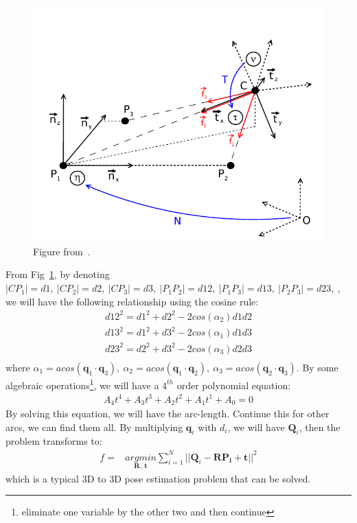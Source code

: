 \documentclass[a4paper]{report}
\begin{document}
\begin{figure}
\centering
\includegraphics[scale=0.5]{hand_eye_files/vision/figures/p3p_kneip.png}
\caption{Figure from~\cite{kneip2011novel}.}
\label{fig:p3p}
\end{figure}
From Fig~\ref{fig:p3p}, by denoting $|CP_1|=d1,\ |CP_2|=d2,\ |CP_3|=d3,\ |P_1P_2|=d12,\ |P_1P_3|=d13,\ |P_2P_3|=d23,\ $, we will have the following relationship using the cosine rule:
\begin{align*}
d12^2 = d1^2+d2^2-2cos(\alpha_2)d1d2 \\
d13^2 = d1^2+d3^2-2cos(\alpha_1)d1d3 \\
d23^2 = d2^2+d3^2-2cos(\alpha_3)d2d3 \\
\end{align*}
where $\alpha_1 = acos(\mathbf{q}_1 \cdot \mathbf{q}_3),\ \alpha_2 = acos(\mathbf{q}_1 \cdot \mathbf{q}_2),\ \alpha_3 = acos(\mathbf{q}_2 \cdot \mathbf{q}_3)$. By some algebraic operations\footnote{eliminate one variable by the other two and then continue}, we will have a $4^{th}$ order polynomial equation:
\begin{align*}
A_4 t^4+A_3 t^3+A_2 t^2+A_1 t^1+A_0 = 0
\end{align*}
By solving this equation, we will have the arc-length. Continue this for other arcs, we can find them all. By multiplying $\mathbf{q}_i$ with $d_i$, we will have $\mathbf{Q}_i$, then the problem transforms to:
\begin{align*}
f =& \underset{\mathbf{R},\ \mathbf{t}}{argmin} \sum_{i=1}^{N}||\mathbf{Q}_i-\mathbf{R}\mathbf{P_i}+\mathbf{t}||^2
\end{align*}
which is a typical $3$D to $3$D pose estimation problem that can be solved.
\end{document}
